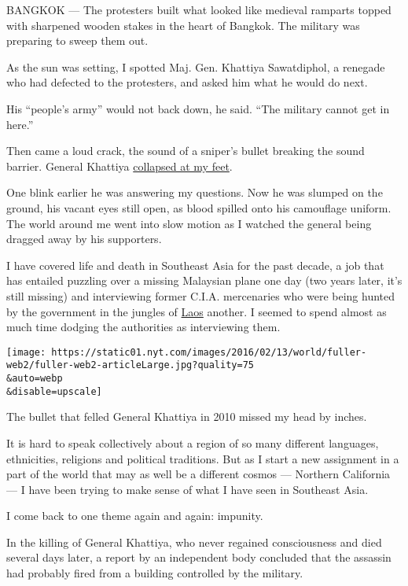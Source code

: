 BANGKOK --- The protesters built what looked like medieval ramparts
topped with sharpened wooden stakes in the heart of Bangkok. The
military was preparing to sweep them out.

As the sun was setting, I spotted Maj. Gen. Khattiya Sawatdiphol, a
renegade who had defected to the protesters, and asked him what he would
do next.

His ``people's army'' would not back down, he said. ``The military
cannot get in here.''

Then came a loud crack, the sound of a sniper's bullet breaking the
sound barrier. General Khattiya
\href{http://www.nytimes.com/2010/05/14/world/asia/14thai.html}{collapsed
at my feet}.

One blink earlier he was answering my questions. Now he was slumped on
the ground, his vacant eyes still open, as blood spilled onto his
camouflage uniform. The world around me went into slow motion as I
watched the general being dragged away by his supporters.

I have covered life and death in Southeast Asia for the past decade, a
job that has entailed puzzling over a missing Malaysian plane one day
(two years later, it's still missing) and interviewing former C.I.A.
mercenaries who were being hunted by the government in the jungles of
\href{http://topics.nytimes.com/top/news/international/countriesandterritories/laos/index.html?inline=nyt-geo}{Laos}
another. I seemed to spend almost as much time dodging the authorities
as interviewing them.

\texttt{[image: https://static01.nyt.com/images/2016/02/13/world/fuller-web2/fuller-web2-articleLarge.jpg?quality=75\\\&auto=webp\\\&disable=upscale]}

The bullet that felled General Khattiya in 2010 missed my head by
inches.

It is hard to speak collectively about a region of so many different
languages, ethnicities, religions and political traditions. But as I
start a new assignment in a part of the world that may as well be a
different cosmos --- Northern California --- I have been trying to make
sense of what I have seen in Southeast Asia.

I come back to one theme again and again: impunity.

In the killing of General Khattiya, who never regained consciousness and
died several days later, a report by an independent body concluded that
the assassin had probably fired from a building controlled by the
military.

